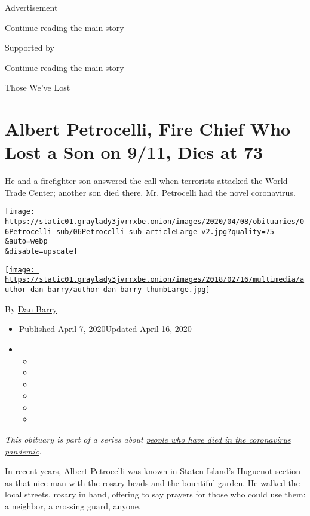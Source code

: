 Advertisement

\protect\hyperlink{after-top}{Continue reading the main story}

Supported by

\protect\hyperlink{after-sponsor}{Continue reading the main story}

Those We've Lost

\hypertarget{albert-petrocelli-fire-chief-who-lost-a-son-on-911-dies-at-73}{%
\section{Albert Petrocelli, Fire Chief Who Lost a Son on 9/11, Dies at
73}\label{albert-petrocelli-fire-chief-who-lost-a-son-on-911-dies-at-73}}

He and a firefighter son answered the call when terrorists attacked the
World Trade Center; another son died there. Mr. Petrocelli had the novel
coronavirus.

\texttt{[image: https://static01.graylady3jvrrxbe.onion/images/2020/04/08/obituaries/06Petrocelli-sub/06Petrocelli-sub-articleLarge-v2.jpg?quality=75\\\&auto=webp\\\&disable=upscale]}

\href{https://www.nytimes3xbfgragh.onion/by/dan-barry}{\texttt{[image: https://static01.graylady3jvrrxbe.onion/images/2018/02/16/multimedia/author-dan-barry/author-dan-barry-thumbLarge.jpg]}}

By \href{https://www.nytimes3xbfgragh.onion/by/dan-barry}{Dan Barry}

\begin{itemize}
\item
  Published April 7, 2020Updated April 16, 2020
\item
  \begin{itemize}
  \item
  \item
  \item
  \item
  \item
  \item
  \end{itemize}
\end{itemize}

\emph{This obituary is part of a series about}
\href{https://www.nytimes3xbfgragh.onion/series/people-who-have-died-of-the-coronavirus}{\emph{people
who have died in the coronavirus pandemic}}\emph{.}

In recent years, Albert Petrocelli was known in Staten Island's Huguenot
section as that nice man with the rosary beads and the bountiful garden.
He walked the local streets, rosary in hand, offering to say prayers for
those who could use them: a neighbor, a crossing guard, anyone.

